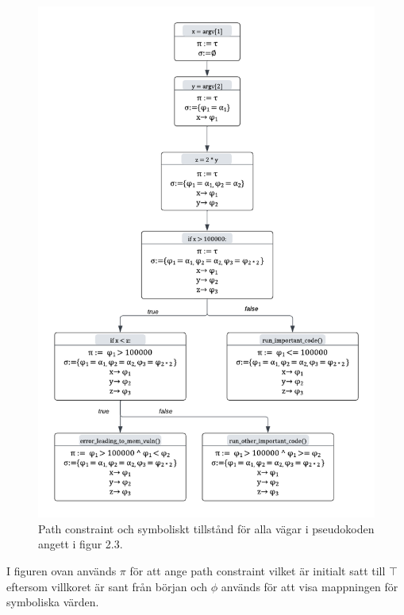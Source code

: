 \begin{figure}[H]
\centering
\includegraphics[scale=0.5]{figures/final_symbolic_example_graph.png}
\caption{Path constraint och symboliskt tillstånd för alla vägar i
    pseudokoden angett i figur 2.3.}
\end{figure}

I figuren ovan används $\pi$ för att ange path constraint vilket är initialt satt
till $\top$ eftersom villkoret är sant från början och $\phi$ används för att visa
mappningen för symboliska värden.

